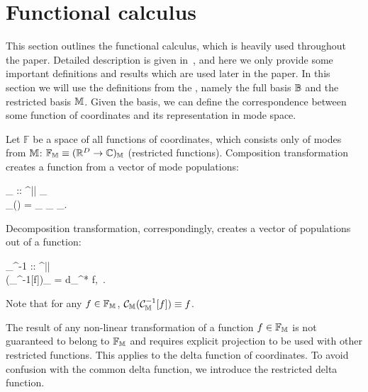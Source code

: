\section{Functional calculus}

This section outlines the functional calculus, which is heavily used throughout the paper.
Detailed description is given in~\cite{Dalton2011}, and here we only provide some important definitions and results which are used later in the paper.
In this section we will use the definitions from the , namely the full basis $\mathbb{B}$ and the restricted basis $\mathbb{M}$.
Given the basis, we can define the correspondence between some function of coordinates and its representation in mode space.

\begin{definition}
	Let $\mathbb{F}$ be a space of all functions of coordinates, which consists only of modes from $\mathbb{M}$: $\mathbb{F}_{\mathbb{M}} \equiv (\mathbb{R}^D \rightarrow \mathbb{C})_{\mathbb{M}}$ (restricted functions).
	Composition transformation creates a function from a vector of mode populations:
	\begin{eqn*}
		_{\restbasis} :: ^{|\restbasis|} \rightarrow {}_{\restbasis} \\
		_{\restbasis}(\balpha) = \sum_{\nvec \in \restbasis} \phi_{\nvec} \alpha_{\nvec}.
	\end{eqn*}
	Decomposition transformation, correspondingly, creates a vector of populations out of a function:
	\begin{eqn*}
		_{\restbasis}^{-1} ::  \rightarrow {}^{|\restbasis|} \\
		(_{\restbasis}^{-1}[f])_{\nvec}
		= \int d\xvec \phi_{\nvec}^* f,\,{\nvec} \in \restbasis.
	\end{eqn*}
	Note that for any $f \in \mathbb{F}_{\mathbb{M}}$, $\mathcal{C}_{\mathbb{M}}(\mathcal{C}_{\mathbb{M}}^{-1}[f]) \equiv f$.
\end{definition}

The result of any non-linear transformation of a function $f \in \mathbb{F}_{\mathbb{M}}$ is not guaranteed to belong to $\mathbb{F}_{\mathbb{M}}$ and requires explicit projection to be used with other restricted functions.
This applies to the delta function of coordinates.
To avoid confusion with the common delta function, we introduce the restricted delta function.

